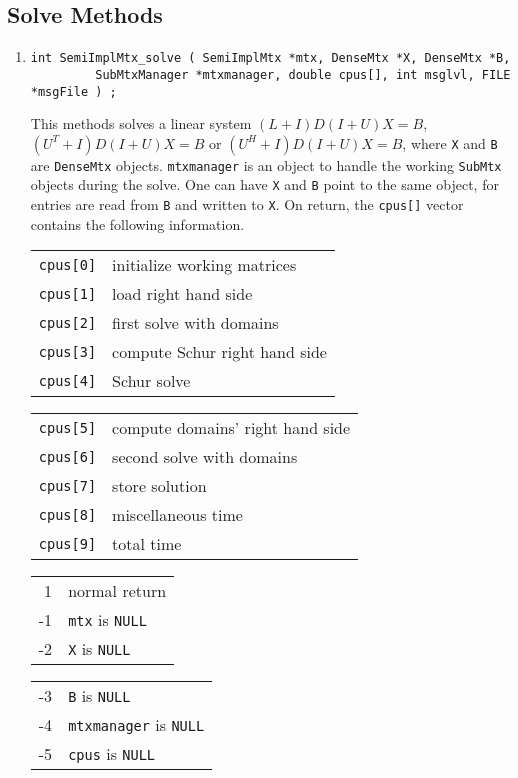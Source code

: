 \subsection{Solve Methods}
\label{subsection:SemiImplMtx:proto:solve}
\par
\begin{enumerate}
\item
\begin{verbatim}
int SemiImplMtx_solve ( SemiImplMtx *mtx, DenseMtx *X, DenseMtx *B, 
         SubMtxManager *mtxmanager, double cpus[], int msglvl, FILE  *msgFile ) ;
\end{verbatim}
This methods solves a linear system
$(L + I)D(I + U)X = B$, $(U^T + I)D(I + U)X = B$ or
$(U^H + I)D(I + U)X = B$,
where {\tt X} and {\tt B} are {\tt DenseMtx} objects.
{\tt mtxmanager} is an object to handle the working
{\tt SubMtx} objects during the solve.
One can have {\tt X} and {\tt B} point to the same object,
for entries are read from {\tt B} and written to {\tt X}.
On return, the {\tt cpus[]} vector contains the following
information.
\begin{center}
\begin{tabular}{rl}
{\tt cpus[0]} & initialize working matrices \\
{\tt cpus[1]} & load right hand side \\
{\tt cpus[2]} & first solve with domains \\
{\tt cpus[3]} & compute Schur right hand side \\
{\tt cpus[4]} & Schur solve
\end{tabular}
\quad
\begin{tabular}{rl}
{\tt cpus[5]} & compute domains' right hand side \\
{\tt cpus[6]} & second solve with domains \\
{\tt cpus[7]} & store solution \\
{\tt cpus[8]} & miscellaneous time \\
{\tt cpus[9]} & total time
\end{tabular}
\end{center}
\par {}
\begin{center}
\begin{tabular}{rl}
 1 & normal return \\
-1 & {\tt mtx} is {\tt NULL} \\
-2 & {\tt X} is {\tt NULL} \\
\end{tabular}
\quad
\begin{tabular}{rl}
-3 & {\tt B} is {\tt NULL} \\
-4 & {\tt mtxmanager} is {\tt NULL} \\
-5 & {\tt cpus} is {\tt NULL} \\
\end{tabular}
\end{center}
\end{enumerate}
\par
